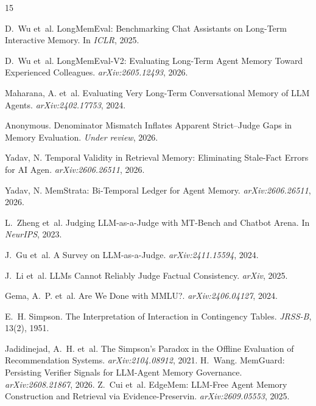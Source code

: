 \documentclass{article}
\begin{document}
\begin{thebibliography}{15}

D.~Wu et~al.
\newblock LongMemEval: Benchmarking Chat Assistants on Long-Term Interactive Memory.
\newblock In \emph{ICLR}, 2025.

D.~Wu et~al.
\newblock LongMemEval-V2: Evaluating Long-Term Agent Memory Toward Experienced Colleagues.
\newblock \emph{arXiv:2605.12493}, 2026.

Maharana, A. et~al.
\newblock Evaluating Very Long-Term Conversational Memory of LLM Agents.
\newblock \emph{arXiv:2402.17753}, 2024.

Anonymous.
\newblock Denominator Mismatch Inflates Apparent Strict--Judge Gaps in Memory Evaluation.
\newblock \emph{Under review}, 2026.

Yadav, N.
\newblock Temporal Validity in Retrieval Memory: Eliminating Stale-Fact Errors for AI Agen. \newblock \emph{arXiv:2606.26511}, 2026.


Yadav, N.
\newblock MemStrata: Bi-Temporal Ledger for Agent Memory.
\newblock \emph{arXiv:2606.26511}, 2026.

L.~Zheng et~al.
\newblock Judging LLM-as-a-Judge with MT-Bench and Chatbot Arena.
\newblock In \emph{NeurIPS}, 2023.

J.~Gu et~al.
\newblock A Survey on LLM-as-a-Judge.
\newblock \emph{arXiv:2411.15594}, 2024.

J.~Li et~al.
\newblock LLMs Cannot Reliably Judge Factual Consistency.
\newblock \emph{arXiv}, 2025.

Gema, A.~P. et~al.
\newblock Are We Done with MMLU?. \newblock \emph{arXiv:2406.04127}, 2024.

E.~H. Simpson.
\newblock The Interpretation of Interaction in Contingency Tables.
\newblock \emph{JRSS-B}, 13(2), 1951.

Jadidinejad, A.~H. et~al.
\newblock The Simpson's Paradox in the Offline Evaluation of Recommendation Systems.
\newblock \emph{arXiv:2104.08912}, 2021.
H.~Wang.
\newblock MemGuard: Persisting Verifier Signals for LLM-Agent Memory Governance. \newblock \emph{arXiv:2608.21867}, 2026.
Z.~Cui et~al.
\newblock EdgeMem: LLM-Free Agent Memory Construction and Retrieval via Evidence-Preservin. \newblock \emph{arXiv:2609.05553}, 2025.


\end{thebibliography}
\end{document}

